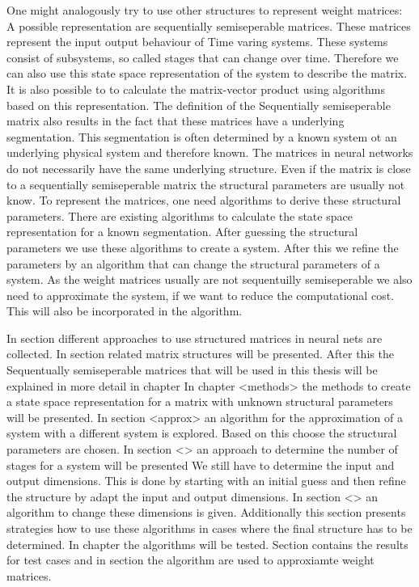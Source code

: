 \documentclass[doctype=mastersthesis,BCOR=15mm,biblatex]{ldvbook}%
\begin{document}
One might analogously try to use other structures to represent weight matrices:
A possible representation are sequentially semiseperable matrices. 
These matrices represent the input output behaviour of
Time varing systems.
These systems consist of  subsystems, so called stages that can change over time.
Therefore we can also use this state space representation of the system to describe the matrix.
It is also possible to to calculate the matrix-vector product using algorithms based on this representation.
The definition of the Sequentially semiseperable matrix also results in the fact that these matrices have a underlying segmentation.
This segmentation is often determined by a known system ot an underlying physical system and therefore known. 
The matrices in neural networks do not necessarily have the same underlying structure.
Even if the matrix is close to a sequentially semiseperable matrix the structural parameters are usually not know.
To represent the matrices, one need algorithms to derive these structural parameters.
There are existing algorithms to calculate the state space representation for a known segmentation.
After guessing the structural parameters we use these algorithms to create a system.
After this we refine the parameters by an algorithm that can change the structural parameters of a system.
As the weight matrices usually are not sequentuilly semiseperable we also need to approximate the system, if we want to reduce the computational cost.
This will also be incorporated in the algorithm.

In section different approaches to use structured matrices in neural nets are collected.
In section related matrix structures will be presented.
After this the Sequentually semiseperable matrices that will be used in this thesis will be explained in more detail in chapter
In chapter <methods> the methods to create a state space representation for a matrix with unknown structural parameters will be presented.
In section <approx> an algorithm for the approximation of a system with a different system is explored.
Based on this choose the structural parameters are chosen.
In section <> an approach to determine the number of stages for a system will be presented
We still have to determine the input and output dimensions.
This is done by starting with an initial guess and then refine the structure by adapt the input and output dimensions.
In section <> an algorithm to change these dimensions is given.
Additionally this section presents strategies how to use these algorithms in cases where the final structure has to be determined.
In chapter the algorithms will be tested.
Section contains the results for test cases and in section the algorithm are used to approxiamte weight matrices.
\end{document}

